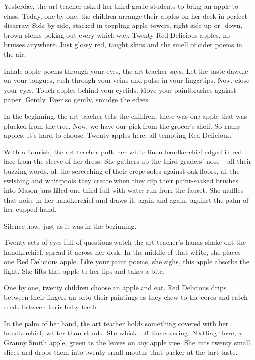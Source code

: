 \documentclass[twoside,10pt]{book}
\begin{document}
Yesterday, the art teacher asked her third grade students to bring an
apple to class. Today, one by one, the children arrange their apples on
her desk in perfect disarray: Side-by-side, stacked in toppling apple
towers, right-side-up or -down, brown stems poking out every which way.
Twenty Red Delicious apples, no bruises anywhere. Just glossy red,
taught skins and the smell of cider poems in the air.

Inhale apple poems through your eyes, the art teacher says. Let the
taste dawdle on your tongues, rush through your veins and pulse in your
fingertips. Now, close your eyes. Touch apples behind your eyelids. Move
your paintbrushes against paper. Gently. Ever so gently, smudge the
edges.

In the beginning, the art teacher tells the children, there was one
apple that was plucked from the tree. Now, we have our pick from the
grocer's shelf. So many apples. It's hard to choose. Twenty apples here:
all tempting Red Delicious.

With a flourish, the art teacher pulls her white linen handkerchief
edged in red lace from the sleeve of her dress. She gathers up the third
graders' nose -- all their buzzing words, all the screeching of their
crepe soles against oak floors, all the swishing and whirlpools they
create when they dip their paint-soaked brushes into Mason jars filled
one-third full with water run from the faucet. She muffles that noise in
her handkerchief and draws it, again and again, against the palm of her
cupped hand.

Silence now, just as it was in the beginning.

Twenty sets of eyes full of questions watch the art teacher's hands
shake out the handkerchief, spread it across her desk. In the middle of
that white, she places one Red Delicious apple. Like your paint poems,
she sighs, this apple absorbs the light. She lifts that apple to her
lips and takes a bite.

One by one, twenty children choose an apple and eat. Red Delicious drips
between their fingers an onto their paintings as they chew to the cores
and catch seeds between their baby teeth.

In the palm of her hand, the art teacher holds something covered with
her handkerchief, whiter than clouds. She whisks off the covering.
Nestling there, a Granny Smith apple, green as the leaves on any apple
tree. She cuts twenty small slices and drops them into twenty small
mouths that pucker at the tart taste.
\end{document}
